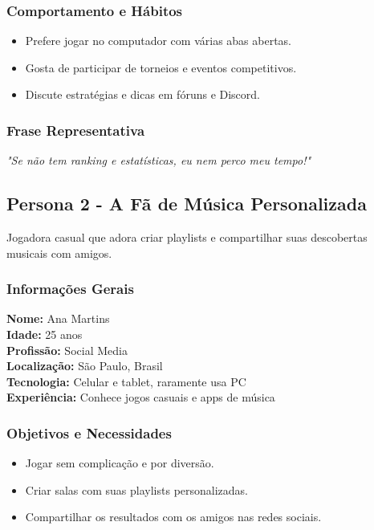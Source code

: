 \begin{titlepage}
    \subsubsection{Comportamento e Hábitos}
        \begin{itemize}
            \item Prefere jogar no computador com várias abas abertas.
            \item Gosta de participar de torneios e eventos competitivos.
            \item Discute estratégias e dicas em fóruns e Discord.
        \end{itemize}
    
    \subsubsection{Frase Representativa}
        \textit{"Se não tem ranking e estatísticas, eu nem perco meu tempo!"}

    \subsection{Persona 2 - A Fã de Música Personalizada}
    Jogadora casual que adora criar playlists e compartilhar suas descobertas musicais com amigos.

    \subsubsection{Informações Gerais}
        \textbf{Nome:} Ana Martins\\
        \textbf{Idade:} 25 anos\\
        \textbf{Profissão:} Social Media\\
        \textbf{Localização:} São Paulo, Brasil\\
        \textbf{Tecnologia:} Celular e tablet, raramente usa PC\\
        \textbf{Experiência:} Conhece jogos casuais e apps de música\\

    \subsubsection{Objetivos e Necessidades}
        \begin{itemize}
            \item Jogar sem complicação e por diversão.
            \item Criar salas com suas playlists personalizadas.
            \item Compartilhar os resultados com os amigos nas redes sociais.
        \end{itemize}


\end{titlepage}
